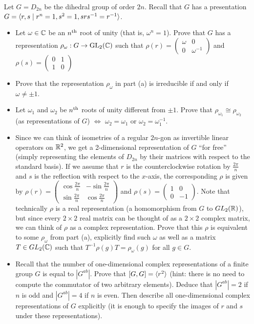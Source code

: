 \documentclass[11pt]{amsart}
\begin{document}
Let $G=D_{2n}$ be the dihedral group of order $2n$. Recall that $G$ has a presentation 
$G={\langle} r,s \mid r^n=1, s^2=1, srs^{-1}=r^{-1}{\rangle}$. 
\begin{itemize}
\item[(a)] Let $\omega\in{\mathbb C}$ be an $n^{\rm th}$ root of unity (that is, $\omega^n=1$). Prove that $G$ has a representation 
$\rho_{\omega}:G\to {\rm GL}_2({\mathbb C})$ such that $\rho(r)=\begin{pmatrix}\omega & 0\\ 0 &\omega^{-1}
\end{pmatrix}$ and $\rho(s)=\begin{pmatrix}0 & 1\\ 1 &0\end{pmatrix}$
\item[(b)] Prove that the representation $\rho_{\omega}$ in part (a) is irreducible if and only if $\omega\neq \pm 1$.
\item[(c)] Let $\omega_1$ and $\omega_2$ be $n^{\rm th}$ roots of unity different from $\pm 1$. Prove that 
$\rho_{\omega_1}\cong \rho_{\omega_2}$ (as representations of $G$) $\iff$ $\omega_2=\omega_1$ or $\omega_2=\omega_1^{-1}$.
\item[(d)] Since we can think of isometries of a regular $2n$-gon as invertible linear operators on ${\mathbb R}^2$, we get a 2-dimensional representation of $G$ ``for free'' (simply representing the elements of $D_{2n}$ by their matrices with respect to the standard basis).
If we assume that $r$ is the counterclockwise rotation by $\frac{2\pi}{n}$ and $s$ is the reflection with respect to the $x$-axis, 
the corresponding $\rho$ is given by $\rho(r)=\begin{pmatrix}\cos\frac{2\pi}{n} & -\sin\frac{2\pi}{n}\\ \sin\frac{2\pi}{n} &\cos\frac{2\pi}{n}\end{pmatrix}$ and $\rho(s)=\begin{pmatrix}1 & 0\\ 0 &-1\end{pmatrix}$. Note that technically $\rho$ is a real representation
(a homomorphism from $G$ to $GL_2({\mathbb R})$), but since every $2\times 2$ real matrix can be thought of as a  $2\times 2$ complex matrix,
we can think of $\rho$ as a complex representation. Prove that this $\rho$ is equivalent to some $\rho_{\omega}$ from part (a),
explicitly find such $\omega$ as well as a matrix $T\in GL_2({\mathbb C})$ such that $T^{-1}\rho(g) T=\rho_{\omega}(g)$ for all $g\in G$. 
\item[(e)] Recall that the number of one-dimensional complex representations of a finite group $G$ is equal to $|G^{ab}|$. 
Prove that $[G,G]={\langle} r^2{\rangle}$ (hint: there is no need to compute the commutator of two arbitrary elements). Deduce that $|G^{ab}|=2$
if $n$ is odd and $|G^{ab}|=4$ if $n$ is even. Then describe all one-dimensional complex representations of $G$ explicitly
(it is enough to specify the images of $r$ and $s$ under these representations).  
\end{itemize}
\end{document}

